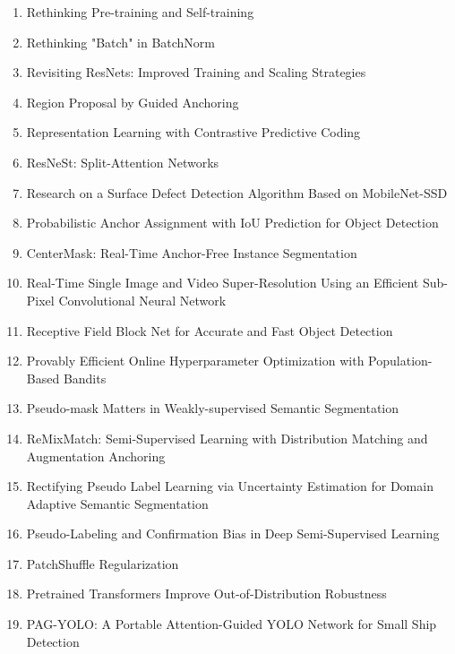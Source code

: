 \documentclass[acmlarge]{acmart}
\begin{document}
\begin{enumerate}
	\item Rethinking Pre-training and Self-training \cite{Zoph2020RethinkingPA}
	\item Rethinking "Batch" in BatchNorm \cite{Wu2021RethinkingI}
	\item Revisiting ResNets: Improved Training and Scaling Strategies \cite{Bello2021RevisitingRI}
	\item Region Proposal by Guided Anchoring \cite{Wang2019RegionPB}
	\item Representation Learning with Contrastive Predictive Coding \cite{Oord2018RepresentationLW}
	\item ResNeSt: Split-Attention Networks \cite{Zhang2020ResNeStSN}
	\item Research on a Surface Defect Detection Algorithm Based on MobileNet-SSD \cite{Li2018ResearchOA}
	\item Probabilistic Anchor Assignment with IoU Prediction for Object Detection \cite{Kim2020ProbabilisticAA}
	\item CenterMask: Real-Time Anchor-Free Instance Segmentation \cite{Lee2020CenterMaskRA}
	\item Real-Time Single Image and Video Super-Resolution Using an Efficient Sub-Pixel Convolutional Neural Network \cite{Shi2016RealTimeSI}
	\item Receptive Field Block Net for Accurate and Fast Object Detection \cite{Liu2018ReceptiveFB}
	\item Provably Efficient Online Hyperparameter Optimization with Population-Based Bandits \cite{ParkerHolder2020ProvablyEO}
	\item Pseudo-mask Matters in Weakly-supervised Semantic Segmentation \cite{Li2021PseudomaskMI}
	\item ReMixMatch: Semi-Supervised Learning with Distribution Matching and Augmentation Anchoring \cite{Berthelot2020ReMixMatchSL}
	\item Rectifying Pseudo Label Learning via Uncertainty Estimation for Domain Adaptive Semantic Segmentation \cite{Zheng2021RectifyingPL}
	\item Pseudo-Labeling and Confirmation Bias in Deep Semi-Supervised Learning \cite{Arazo2020PseudoLabelingAC}
	\item PatchShuffle Regularization \cite{Kang2017PatchShuffleR}
	\item Pretrained Transformers Improve Out-of-Distribution Robustness \cite{Hendrycks2020PretrainedTI}
	\item PAG-YOLO: A Portable Attention-Guided YOLO Network for Small Ship Detection \cite{Hu2021PAGYOLOAP}

\end{enumerate}
\end{document}
